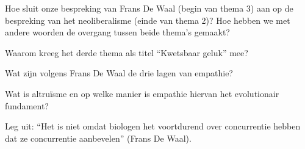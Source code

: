 \documentclass[main.tex]{subfiles}
\begin{document}
\begin{examenvraag}
    \begin{vraag}
        Hoe sluit onze bespreking van Frans De Waal (begin van thema 3) aan op de bespreking van het neoliberalisme (einde van thema 2)? Hoe hebben we met andere woorden de overgang tussen beide thema’s gemaakt?
    \end{vraag}

    \begin{antwoord}
    \end{antwoord}
\end{examenvraag}


\begin{examenvraag}
    \begin{vraag}
        Waarom kreeg het derde thema als titel “Kwetsbaar geluk” mee?
    \end{vraag}

    \begin{antwoord}
    \end{antwoord}
\end{examenvraag}


\begin{examenvraag}
    \begin{vraag}
        Wat zijn volgens Frans De Waal de drie lagen van empathie?
    \end{vraag}

    \begin{antwoord}
    \end{antwoord}
\end{examenvraag}


\begin{examenvraag}
    \begin{vraag}
        Wat is altruïsme en op welke manier is empathie hiervan het evolutionair fundament?
    \end{vraag}

    \begin{antwoord}
    \end{antwoord}
\end{examenvraag}


\begin{examenvraag}
    \begin{vraag}
        Leg uit: “Het is niet omdat biologen het voortdurend over concurrentie hebben dat ze concurrentie aanbevelen” (Frans De Waal).
    \end{vraag}

    \begin{antwoord}
    \end{antwoord}
\end{examenvraag}
\end{document}
